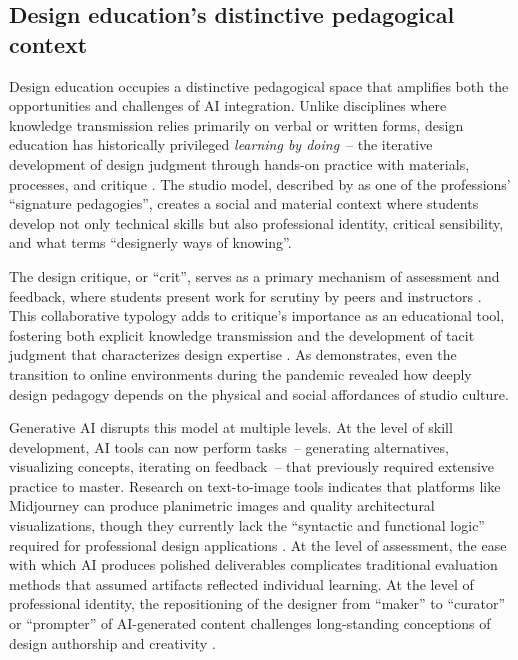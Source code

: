 \documentclass[ed]{acnsart}
\newcommand{\keyterm}[1]{\textit{#1}}
\begin{document}
\subsection{Design education's distinctive pedagogical context}

Design education occupies a distinctive pedagogical space that amplifies both the opportunities and challenges of AI integration. Unlike disciplines where knowledge transmission relies primarily on verbal or written forms, design education has historically privileged \keyterm{learning by doing}~-- the iterative development of design judgment through hands-on practice with materials, processes, and critique \cite{Schon1983}. The studio model, described by \citet{Shulman2005} as one of the professions' ``signature pedagogies'', creates a social and material context where students develop not only technical skills but also professional identity, critical sensibility, and what \citet{Cross2011} terms ``designerly ways of knowing''.

The design critique, or ``crit'', serves as a primary mechanism of assessment and feedback, where students present work for scrutiny by peers and instructors \cite{AbdElLatif2020}. This collaborative typology adds to critique's importance as an educational tool, fostering both explicit knowledge transmission and the development of tacit judgment that characterizes design expertise \cite{Fleischmann2025}. As \citet{Tufek2022} demonstrates, even the transition to online environments during the pandemic revealed how deeply design pedagogy depends on the physical and social affordances of studio culture.

Generative AI disrupts this model at multiple levels. At the level of skill development, AI tools can now perform tasks~-- generating alternatives, visualizing concepts, iterating on feedback~-- that previously required extensive practice to master. Research on text-to-image tools indicates that platforms like Midjourney can produce planimetric images and quality architectural visualizations, though they currently lack the ``syntactic and functional logic'' required for professional design applications \cite{FernandezMorales2024}. At the level of assessment, the ease with which AI produces polished deliverables complicates traditional evaluation methods that assumed artifacts reflected individual learning. At the level of professional identity, the repositioning of the designer from ``maker'' to ``curator'' or ``prompter'' of AI-generated content challenges long-standing conceptions of design authorship and creativity \cite{Iranmanesh2024}.
\end{document}
